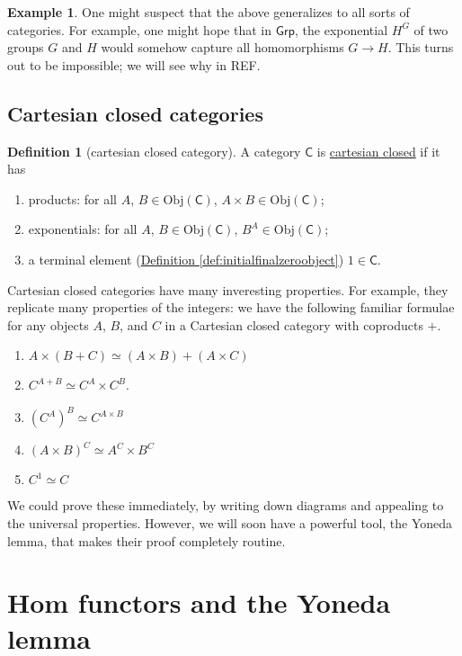 \documentclass[a4paper]{report}
\newcommand{\defn}[1]{\ul{#1}}
\newcommand{\Obj}{\mathrm{Obj}}
\theoremstyle{definition}
\newtheorem{definition}{Definition}[section]
\newtheorem{example}{Example}[section]
\theoremstyle{plain}
\theoremstyle{remark}
\begin{document}
\begin{example}
  One might suspect that the above generalizes to all sorts of categories. For example, one might hope that in $\mathsf{Grp}$, the exponential $H^{G}$ of two groups $G$ and $H$ would somehow capture all homomorphisms $G \to H$. This turns out to be impossible; we will see why in REF.
\end{example}

\subsection{Cartesian closed categories}
\begin{definition}[cartesian closed category]
  \label{def:cartesianclosedcategory}
  A category $\mathsf{C}$ is \defn{cartesian closed} if it has
  \begin{enumerate}
    \item products: for all $A$, $B \in \Obj(\mathsf{C})$, $A \times B \in \Obj(\mathsf{C})$;
    \item exponentials: for all $A$, $B \in \Obj(\mathsf{C})$, $B^{A} \in \Obj(\mathsf{C})$;
    \item a terminal element (\hyperref[def:initialfinalzeroobject]{Definition \ref*{def:initialfinalzeroobject}}) $1 \in \mathsf{C}$.
  \end{enumerate}
\end{definition}

Cartesian closed categories have many inveresting properties. For example, they replicate many properties of the integers: we have the following familiar formulae for any objects $A$, $B$, and $C$ in a Cartesian closed category with coproducts $+$.
\begin{enumerate} 
  \item $A \times (B + C) \simeq (A \times B) + (A \times C)$
  \item $C^{A + B} \simeq C^{A} \times C^{B}$.
  \item $(C^{A})^{B} \simeq C^{A \times B}$
  \item $(A \times B)^{C} \simeq A^{C} \times B^{C}$
  \item $C^{1} \simeq C$
\end{enumerate}

We could prove these immediately, by writing down diagrams and appealing to the universal properties. However, we will soon have a powerful tool, the Yoneda lemma, that makes their proof completely routine.

\section{Hom functors and the Yoneda lemma} \label{sec:homfunctorsandyoneda}
\end{document}
